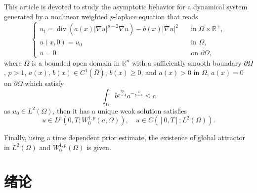 \documentclass[oneside,longtitle]{LZUthesis}
\numberwithin{equation}{chapter}
\newcommand*\abs[1]{\lvert#1\rvert}
\newcommand\R{\mathbb{R}}
\DeclareMathOperator{\Div}{div}
\begin{document}

\begin{englishabstract}
	This article is devoted to study the asymptotic behavior for a dynamical system generated by a nonlinear
	weighted $p$-laplace equation that reads
	\begin{equation*}
		\begin{cases}
			u_t = \Div(a(x)\abs{\nabla u}^{p-2}\nabla u) - b(x)\abs{\nabla u}^2 \quad &\text{in } \Omega \times \R^+,\\
			u(x,0) = u_0 \quad &\text{in } \Omega,\\
			u = 0 \quad &\text{on } \partial\Omega,
		\end{cases}
	\end{equation*}
	where $\Omega$ is a bounded open domain in $\R^{n}$ with a sufficiently smooth boundary $\partial\Omega$, $p>1$,
	$ a(x)$, $b(x) \in C^1(\bar{\Omega}) $, $b(x) \geq 0$, and $a(x) > 0$ in $\Omega$, $a(x) = 0$ on $\partial\Omega$ which satisfy
	\begin{equation*}
		\int_{\Omega} b^{\frac{2p}{p-4}}a^{-\frac{4}{p-4}} \leq c
	\end{equation*}
	as $u_0 \in L^2(\Omega) $, then it has a unique weak solution satisfies
	\begin{equation*}
	u \in L^p(0, T; W_0^{1,p}(a,\Omega)), \quad u \in C([0, T]; L^2(\Omega)).
	\end{equation*}

	Finally, using a time dependent prior estimate, the existence of global attractor in $L^2(\Omega)$ and $W_0^{1,p}(\Omega)$ is given.
\end{englishabstract}


\tableofcontents{}


\mainmatter

\pagestyle{lzu}


\chapter{绪论}
\end{document}
